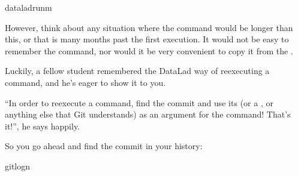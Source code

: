 \begin{sphinxVerbatim}[commandchars=\\\{\}]
dataladrun\PYGZhy{}m
\end{sphinxVerbatim}

\sphinxAtStartPar
However, think about any situation where the command would be longer than this,
or that is many months past the first execution. It would not be easy to remember
the command, nor would it be very convenient to copy it from the .

\sphinxAtStartPar
Luckily, a fellow student remembered the DataLad way of re\sphinxhyphen{}executing
a  command, and he’s eager to show it to you.

\sphinxAtStartPar
“In order to re\sphinxhyphen{}execute a  command,
find the commit and use its {\hyperref[\detokenize{glossary:term-shasum}]{}} (or a {\hyperref[\detokenize{glossary:term-tag}]{}}, or anything else that Git
understands) as an argument for the
 command! That’s it!”,
he says happily.

\sphinxAtStartPar
So you go ahead and find the commit {\hyperref[\detokenize{glossary:term-shasum}]{}} in your history:

%
\begin{sphinxVerbatim}[commandchars=\\\{\}]
gitlog\PYGZhy{}n



\end{sphinxVerbatim}
\sphinxresetverbatimhllines

